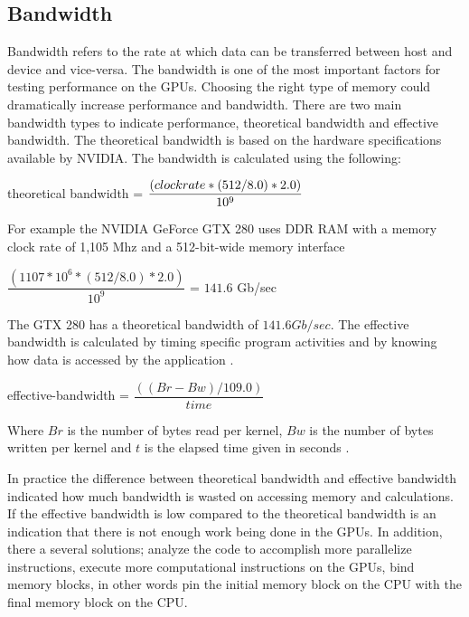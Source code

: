 \subsection{Bandwidth}

Bandwidth refers to the rate at which data can be transferred between host and device and vice-versa. The bandwidth is one of the most important factors for testing performance on the GPUs. Choosing the right type of memory could dramatically increase performance and bandwidth. There are two main bandwidth types to indicate performance, theoretical bandwidth and effective bandwidth. The theoretical bandwidth is based on the hardware specifications available by NVIDIA. The bandwidth is calculated using the following:

\vspace{0.8em}
\begin{center}
 {\listf theoretical bandwidth} = $\dfrac{({\listf clock rate} * (512 / 8.0 ) * 2.0)} { 10^{9}}$
\end{center}
\vspace{0.8em}

For example the NVIDIA GeForce GTX 280 uses DDR RAM with a memory clock rate of 1,105 Mhz and a 512-bit-wide memory interface

\vspace{0.8em}
\begin{center}
$\dfrac{(1107 * 10^6 * (512/8.0) * 2.0 )}{10^9}$ = $141.6$ Gb/sec
\end{center}
\vspace{0.8em}

The GTX 280 has a theoretical bandwidth of $141.6Gb/sec$. The effective bandwidth is calculated by timing specific program activities and by knowing how data is accessed by the application \cite{practices}.

\vspace{0.8em}
\begin{center}
{\listf effective-bandwidth} = $\dfrac{((Br - Bw) / 109.0 )}{time}$
\end{center}
\vspace{0.8em}

Where $Br$ is the number of bytes read per kernel, $Bw$ is the number of bytes written per kernel and  $t$ is the elapsed time given in seconds \cite{fortran}.

In practice the difference between theoretical bandwidth and effective bandwidth indicated how much bandwidth is wasted on accessing memory and calculations. If the effective bandwidth is low compared to the theoretical bandwidth is an indication that there is not enough work being done in the GPUs. In addition, there a several solutions; analyze the code to accomplish more parallelize instructions, execute more computational instructions on the GPUs, bind memory blocks, in other words pin the initial memory block on the CPU with the final memory  block on the CPU.

